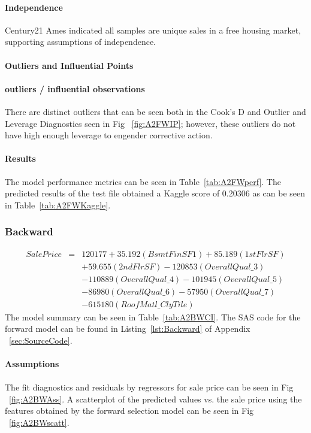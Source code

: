 \documentclass[11pt]{scrartcl} %
\begin{document}
\paragraph{Independence} Century21 Ames indicated all samples are unique sales in a free housing market, supporting assumptions of independence. 
\paragraph{Outliers and Influential Points}
\paragraph{outliers / influential observations} There are distinct outliers that can be seen both in the Cook's D and Outlier and Leverage Diagnostics seen in Fig ~\ref{fig:A2FWIP}; however, these outliers do not have high enough leverage to engender corrective action.
\paragraph{Results} The model performance metrics can be seen in Table~\ref{tab:A2FWperf}. The predicted results of the test file obtained a Kaggle score of 0.20306 as can be seen in Table~\ref{tab:A2FWKaggle}.

\subsubsection{Backward}
\begin{eqnarray*}
SalePrice &=& 120177 + 35.192(BsmtFinSF1) + 85.189(1stFlrSF) \\
& & + 59.655(2ndFlrSF) - 120853(OverallQual\_3)\\
& & - 110889(OverallQual\_4) - 101945(OverallQual\_5)\\
& & - 86980(OverallQual\_6) - 57950(OverallQual\_7) \\
& & - 615180(RoofMatl\_ClyTile)
\end{eqnarray*}
The model summary can be seen in Table~\ref{tab:A2BWCI}. The SAS code for the forward model can be found in Listing~\ref{lst:Backward} of Appendix ~\ref{sec:SourceCode}.
\paragraph{Assumptions}
\paragraph{}The fit diagnostics and residuals by regressors for sale price can be seen in Fig ~\ref{fig:A2BWAss}. A scatterplot of the predicted values vs. the sale price using the features obtained by the forward selection model can be seen in Fig ~\ref{fig:A2BWscatt}.
\end{document}
